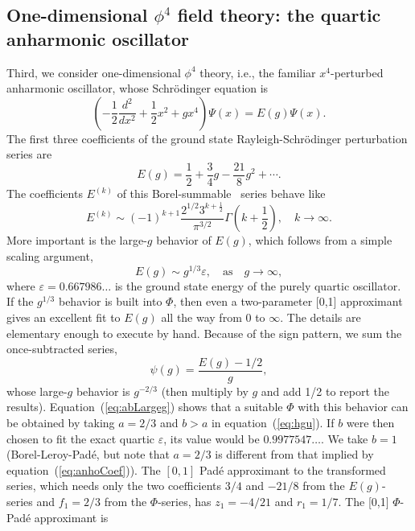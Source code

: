 \documentclass[12pt]{iopart}
\begin{document}
\subsection{One-dimensional $\phi^4$ field theory: the quartic anharmonic oscillator}
Third, we consider one-dimensional $\phi^4$ theory, i.e., the familiar $x^4$-perturbed
anharmonic oscillator, whose Schr\"odinger equation is
%
\begin{equation}
	\label{eq:x4sch}
  \left(-\frac{1}{2}\frac{d^2}{dx^2} +\frac{1}{2}x^2 +gx^4\right)\Psi(x) = E(g) \Psi(x).
  \end{equation}
%
The first three coefficients of the ground state Rayleigh-Schr\"odinger perturbation series are
%
 \begin{equation}
 	E(g) = \frac{1}{2}+\frac{3}{4} g -\frac{21}{8}  g^2 + \cdots.
	\label{eq:x4RSPT}
\end{equation}
%
The coefficients $E^{(k)}$ of this Borel-summable~\cite{GR70} series behave like
\begin{equation}
   \label{eq:anhoCoef}
	E^{(k)} \sim 
	(-1)^{k+1} \frac{2^{1/2} 3^{k+\frac{1}{2}}}{ \pi^{3/2}} \Gamma\left(k+\frac{1}{2}\right),
	\quad k\to\infty .
\end{equation}
%
More important is the large-$g$ behavior of $E(g)$, which follows from a simple scaling argument, 
%
\begin{equation}
	E(g) \sim g^{1/3} \varepsilon, \quad \mathrm{as }\quad g\rightarrow \infty,
\end{equation}
%
where $\varepsilon = 0.667986\ldots$ is the ground state energy of the purely quartic oscillator.
If the $g^{1/3}$ behavior is built into  $\Phi$, then even a two-parameter [0,1] approximant gives an excellent fit to $E(g)$ all the way from 0 to $\infty$.
The details are elementary enough to execute by hand. Because of the sign pattern, we sum the once-subtracted
series,
%
\begin{equation}
	\psi(g) = \frac{E(g)-1/2}{g},
\end{equation}
%
whose large-$g$ behavior is $g^{-2/3}$ (then multiply by $g$ and add 1/2 to report the results). 
Equation~(\ref{eq:abLargeg}) shows that a suitable $\Phi$ with this behavior can be obtained by taking
$a=2/3$ and $b>a$ in equation~(\ref{eq:hgu}). If $b$ were then chosen to fit the exact quartic $\varepsilon$, its value would be $0.9977547\ldots$.
We take $b=1$ (Borel-Leroy-Pad\'e, but note that $a=2/3$ is different from that implied by equation~(\ref{eq:anhoCoef})). The $[0,1]$ Pad\'e approximant to the transformed series, which needs only the two coefficients $3/4$ and $-21/8$ from the $E(g)$-series and $f_1=2/3$ from the $\Phi$-series, has $z_1=-4/21$ and $r_1=1/7$. The [0,1] $\Phi$-Pad\'e approximant is
\end{document}
